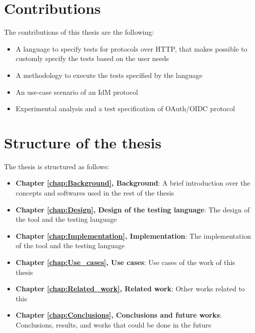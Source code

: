 \section{Contributions}
The contributions of this thesis are the following:
\begin{itemize}
    \item A language to specify tests for protocols over HTTP, that makes possible to customly specify the tests based on the user needs
    \item A methodology to execute the tests specified by the language
    \item An use-case scenario of an IdM protocol
    \item Experimental analysis and a test specification of OAuth/OIDC protocol
\end{itemize}

\section{Structure of the thesis}
The thesis is structured as follows:
\begin{itemize}
    \item \textbf{Chapter \ref{chap:Background}, Background}: A brief introduction over the concepts and softwares used in the rest of the thesis
    \item \textbf{Chapter \ref{chap:Design}, Design of the testing language}: The design of the tool and the testing language
    \item \textbf{Chapter \ref{chap:Implementation}, Implementation}: The implementation of the tool and the testing language
    \item \textbf{Chapter \ref{chap:Use_cases}, Use cases}: Use cases of the work of this thesis
    \item \textbf{Chapter \ref{chap:Related_work}, Related work}: Other works related to this
    \item \textbf{Chapter \ref{chap:Conclusions}, Conclusions and future works}: Conclusions, results, and works that could be done in the future
\end{itemize}




